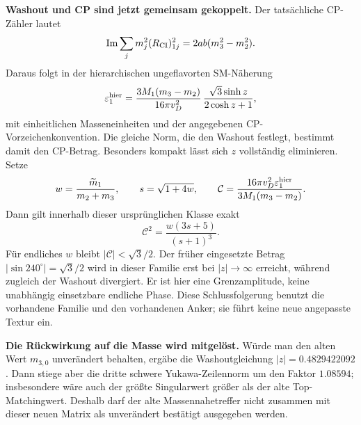 \textbf{Washout und CP sind jetzt gemeinsam gekoppelt.} Der tatsächliche CP-Zähler lautet
\begin{equation}
\operatorname{Im}\sum_jm_j^2(R_{\rm CI})_{1j}^2
=2ab(m_3^2-m_2^2).
\end{equation}
Daraus folgt in der hierarchischen ungeflavorten SM-Näherung
\begin{equation}
\varepsilon_1^{\rm hier}
=\frac{3M_1(m_3-m_2)}{16\pi v_D^2}\,
\frac{\sqrt3\sinh z}{2\cosh z+1},
\end{equation}
mit einheitlichen Masseneinheiten und der angegebenen CP-Vorzeichenkonvention. Die gleiche Norm, die den Washout festlegt, bestimmt damit den CP-Betrag. Besonders kompakt lässt sich $z$ vollständig eliminieren. Setze
\begin{equation}
w=\frac{\widetilde m_1}{m_2+m_3},\qquad s=\sqrt{1+4w},\qquad
\mathcal C=\frac{16\pi v_D^2\varepsilon_1^{\rm hier}}{3M_1(m_3-m_2)}.
\end{equation}
Dann gilt innerhalb dieser ursprünglichen Klasse exakt
\begin{equation}\label{eq:nuwashoutcp}
\boxed{\mathcal C^2=\frac{w(3s+5)}{(s+1)^3}.}
\end{equation}
Für endliches $w$ bleibt $|\mathcal C|<\sqrt3/2$. Der früher eingesetzte Betrag $|\sin240^\circ|=\sqrt3/2$ wird in dieser Familie erst bei $|z|\to\infty$ erreicht, während zugleich der Washout divergiert. Er ist hier eine Grenzamplitude, keine unabhängig einsetzbare endliche Phase. Diese Schlussfolgerung benutzt die vorhandene Familie und den vorhandenen Anker; sie führt keine neue angepasste Textur ein.

\textbf{Die Rückwirkung auf die Masse wird mitgelöst.} Würde man den alten Wert $m_{3,0}$ unverändert behalten, ergäbe die Washoutgleichung $|z|=0.4829422092$. Dann stiege aber die dritte schwere Yukawa-Zeilennorm um den Faktor $1.08594$; insbesondere wäre auch der größte Singularwert größer als der alte Top-Matchingwert. Deshalb darf der alte Massennahetreffer nicht zusammen mit dieser neuen Matrix als unverändert bestätigt ausgegeben werden.

